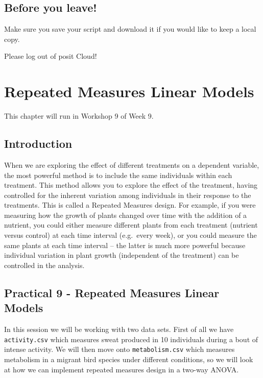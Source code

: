 \documentclass[
]{book}
\begin{document}
\hypertarget{before-you-leave-9}{%
\section{Before you leave!}\label{before-you-leave-9}}

Make sure you save your script and download it if you would like to keep a local copy.

Please log out of posit Cloud!

\hypertarget{repeated-measures-linear-models}{%
\chapter{Repeated Measures Linear Models}\label{repeated-measures-linear-models}}

This chapter will run in Workshop 9 of Week 9.

\hypertarget{introduction-7}{%
\section{Introduction}\label{introduction-7}}

When we are exploring the effect of different treatments on a dependent variable, the most powerful method is to include the same individuals within each treatment. This method allows you to explore the effect of the treatment, having controlled for the inherent variation among individuals in their response to the treatments. This is called a Repeated Measures design. For example, if you were measuring how the growth of plants changed over time with the addition of a nutrient, you could either measure different plants from each treatment (nutrient versus control) at each time interval (e.g.~every week), or you could measure the same plants at each time interval -- the latter is much more powerful because individual variation in plant growth (independent of the treatment) can be controlled in the analysis.

\hypertarget{practical-9---repeated-measures-linear-models}{%
\section{Practical 9 - Repeated Measures Linear Models}\label{practical-9---repeated-measures-linear-models}}

In this session we will be working with two data sets. First of all we have \texttt{activity.csv} which measures sweat produced in 10 individuals during a bout of intense activity. We will then move onto \texttt{metabolism.csv} which measures metabolism in a migrant bird species under different conditions, so we will look at how we can implement repeated measures design in a two-way ANOVA.
\end{document}
